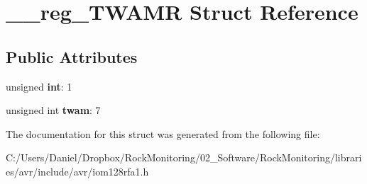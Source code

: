 \hypertarget{struct____reg___t_w_a_m_r}{}\section{\+\_\+\+\_\+reg\+\_\+\+T\+W\+A\+MR Struct Reference}
\label{struct____reg___t_w_a_m_r}
\subsection*{Public Attributes}
\begin{DoxyCompactItemize}
\item 
unsigned {\bfseries int}\+: 1\hypertarget{struct____reg___t_w_a_m_r_a73cec5ecaf7255b72f702ba926d01fc0}{}\label{struct____reg___t_w_a_m_r_a73cec5ecaf7255b72f702ba926d01fc0}

\item 
unsigned int {\bfseries twam}\+: 7\hypertarget{struct____reg___t_w_a_m_r_a08e2dbdce14df21c039df3d002a7a358}{}\label{struct____reg___t_w_a_m_r_a08e2dbdce14df21c039df3d002a7a358}

\end{DoxyCompactItemize}


The documentation for this struct was generated from the following file\+:\begin{DoxyCompactItemize}
\item 
C\+:/\+Users/\+Daniel/\+Dropbox/\+Rock\+Monitoring/02\+\_\+\+Software/\+Rock\+Monitoring/libraries/avr/include/avr/iom128rfa1.\+h\end{DoxyCompactItemize}
